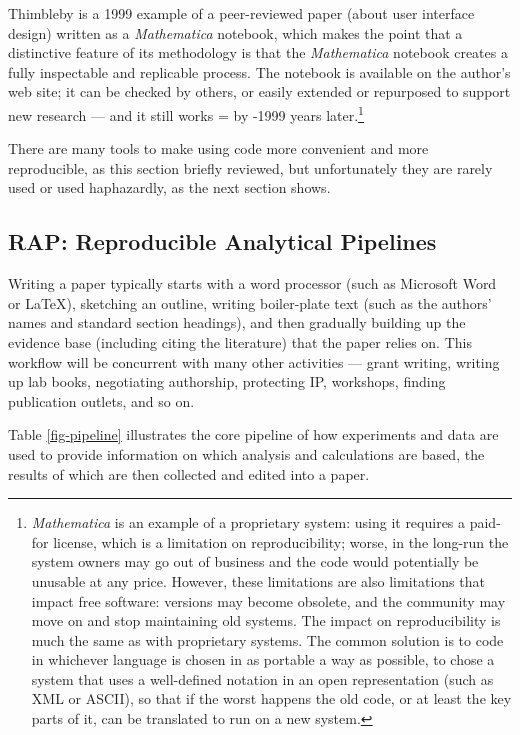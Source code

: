 \documentclass{comjnl}
\begin{document}
\noindent
Thimbleby \cite{spec-led-design} is a 1999 example of a peer-reviewed paper (about user interface design) written as a \emph{Mathematica\/} notebook, which makes the point that a distinctive feature of its methodology is that the \emph{Mathematica\/} notebook creates a fully inspectable and replicable process. The notebook is available on the author's web site; it can be checked by others, or easily extended or repurposed to support new research --- and it still works 
{\newcount \howlong \howlong = \year
\advance \howlong by -1999
\the\howlong}
years later.\footnote{\emph{Mathematica\/} is an example of a proprietary system: using it requires a paid-for license, which is a limitation on reproducibility; worse, in the long-run the system owners may go out of business and the code would potentially be unusable at any price. However, these limitations are also limitations that impact free software: versions may become obsolete, and the community may move on and stop maintaining old systems. The impact on reproducibility is much the same as with proprietary systems. The common solution is to code in whichever language is chosen in as portable a way as possible, to chose a system that uses a well-defined notation in an open representation (such as XML or ASCII), so that if the worst happens the old code, or at least the key parts of it, can be translated to run on a new system.} 

There are many tools to make using code more convenient and more reproducible, as this section briefly reviewed, but unfortunately they are rarely used or used haphazardly, as the next section shows.

\subsection{RAP: Reproducible Analytical Pipelines}\label{RAP-section}
Writing a paper typically starts with a word processor (such as Microsoft Word or \LaTeX), sketching an outline, writing boiler-plate text (such as the authors' names and standard section headings), and then gradually building up the evidence base (including citing the literature) that the paper relies on. This workflow will be concurrent with many other activities --- grant writing, writing up lab books, negotiating authorship, protecting IP, workshops, finding publication outlets, and so on.

Table \ref{fig-pipeline} illustrates the core pipeline of how experiments and data are used to provide information on which analysis and calculations are based, the results of which are then collected and edited into a paper.
\end{document}

